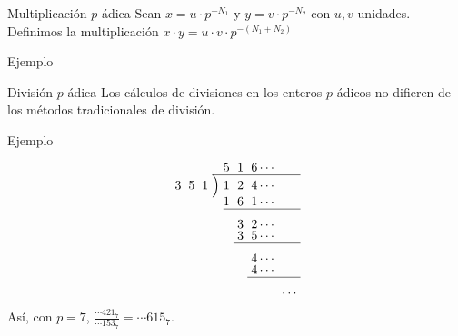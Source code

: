 \documentclass{beamer}
\theoremstyle{definition}
\numberwithin{equation}{section}
\begin{document}
\begin{frame}{Multiplicación $p$-ádica}
	Sean $x=u\cdot p^{-N_1}$ y $y=v\cdot p^{-N_2}$ con $u,v$ unidades. Definimos la multiplicación $x\cdot y = u\cdot v\cdot p^{- (N_1+N_2)}$
	\begin{exampleblock}{Ejemplo}%
		\label{mult_ex}
		
		
		\begin{center}
		\end{center}
	\end{exampleblock}
\end{frame}

\begin{frame}{División $p$-ádica}
	Los cálculos de divisiones en los enteros $p$-ádicos no difieren de los métodos tradicionales de división.
	\begin{exampleblock}{Ejemplo}
		
		\begin{align*}
		\renewcommand\arraystretch{.75}\renewcommand\arraycolsep{3pt}
		\begin{array}{r@{\hskip\arraycolsep}c@{\hskip\arraycolsep}l*5r} %
		&&5&1&6\cdots\\
		\cline{2-6} %
		3\hspace{2mm} 5\hspace{2mm} 1&\Big)&1&2&4\cdots \\
		&&1&6&1\cdots \\
		\cline{3-6}\\
		&&&3&2\cdots\\
		&&&3&5\cdots\\
		\cline{4-6}\\
		&&&&4\cdots\\
		&&&&4\cdots\\
		\cline{5-6}\\
		&&&&&\cdots\\
		\end{array}
		\end{align*}
		Así, con $p=7$, $\frac{\cdots421_7}{\cdots153_7}=\cdots 615_7$.
	\end{exampleblock}
\end{frame}
\end{document}
